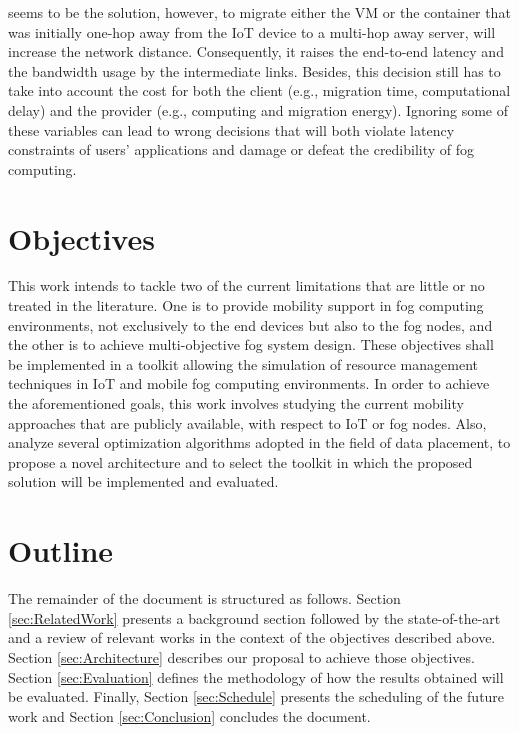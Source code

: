 seems to be the solution, however, to migrate either the VM or the container that was initially one-hop away from the IoT device to a multi-hop away server, will increase the network distance. Consequently, it raises the end-to-end latency and the bandwidth usage by the intermediate links. Besides, this decision still has to take into account the cost for both the client (e.g., migration time, computational delay) and the provider (e.g., computing and migration energy). Ignoring some of these variables can lead to wrong decisions that will both violate latency constraints of users' applications and damage or defeat the credibility of fog computing.

\section{Objectives}\label{subsec:Objectives}
This work intends to tackle two of the current limitations that are little or no treated in the literature. One is to provide mobility support in fog computing environments, not exclusively to the end devices but also to the fog nodes, and the other is to achieve multi-objective fog system design. These objectives shall be implemented in a toolkit allowing the simulation of resource management techniques in IoT and mobile fog computing environments. In order to achieve the aforementioned goals, this work involves studying the current mobility approaches that are publicly available, with respect to IoT or fog nodes. Also, analyze several optimization algorithms adopted in the field of data placement, to propose a novel architecture and to select the toolkit in which the proposed solution will be implemented and evaluated.

\section{Outline}\label{subsec:Outline}
The remainder of the document is structured as follows. Section \ref{sec:RelatedWork} presents a background section followed by the state-of-the-art and a review of relevant works in the context of the objectives described above. Section \ref{sec:Architecture} describes our proposal to achieve those objectives. Section \ref{sec:Evaluation} defines the methodology of how the results obtained will be evaluated. Finally, Section \ref{sec:Schedule} presents the scheduling of the future work and Section \ref{sec:Conclusion} concludes the document.